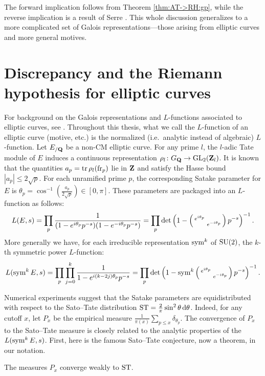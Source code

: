 The forward implication follows from Theorem \ref{thm:AT->RH:gp}, while the reverse implication is a result of Serre \cite[Th.~4]{serre-1981}. 
This whole discussion generalizes to a more complicated set of Galois 
representations---those arising from elliptic curves and more general motives.  





\section{Discrepancy and the Riemann hypothesis for elliptic curves}

For background on the Galois representations and $L$-functions associated to 
elliptic curves, see \cite[III\S7, C\S17]{silverman-2009}. Throughout this 
thesis, what we call the $L$-function of an elliptic curve (motive, etc.) is 
the normalized (i.e.~analytic instead of algebraic) $L$-function. 
Let $E_{/\mathbf{Q}}$ be a non-CM elliptic curve. For any prime $l$, the $l$-adic Tate 
module of $E$ induces a continuous representation 
$\rho_l \colon G_{\mathbf{Q}} \to \operatorname{GL}_2(\mathbf{Z}_l)$. It is known that the quantities 
$a_p = \operatorname{tr} \rho_l(\mathrm{fr}_p)$ lie in $\mathbf{Z}$ and satisfy the Hasse bound 
$|a_p| \leqslant 2\sqrt p$. For each unramified prime $p$, the 
corresponding Satake parameter for $E$ is 
$\theta_p = \cos^{-1}\left(\frac{a_p}{2\sqrt p}\right) \in [0,\pi]$. 
These parameters are packaged into an $L$-function as follows:
\[
	L(E,s) = \prod_p \frac{1}{(1 - e^{i \theta_p} p^{-s})(1- e^{-i \theta_p} p^{-s})} = \prod_p \det\left(1 - \left(\begin{smallmatrix} e^{i\theta_p} &  \\  & e^{-i \theta_p} \end{smallmatrix}\right)p^{-s}\right)^{-1}.
\]
More generally we have, for each irreducible representation $\operatorname{sym}^k$ of 
$\operatorname{SU}(2)$, the $k$-th symmetric power $L$-function: 
\[
	L(\operatorname{sym}^k E, s) = \prod_p \prod_{j=0}^k \frac{1}{1 - e^{i (k - 2j) \theta_p} p^{-s}} = \prod_p \det\left(1-\operatorname{sym}^k \left(\begin{smallmatrix} e^{i\theta_p} &  \\  & e^{-i \theta_p} \end{smallmatrix}\right)p^{-s}\right)^{-1}.
\]

Numerical experiments suggest that the Satake parameters are equidistributed 
with respect to the Sato--Tate distribution 
$\mathrm{ST} = \frac{2}{\pi} \sin^2\theta\, \mathrm{d}\theta$. Indeed, for any cutoff $x$, let 
$P_x$ be the empirical measure 
$\frac{1}{\pi(x)} \sum_{p\leqslant x} \delta_{\theta_p}$. 
The convergence of $P_x$ to the Sato--Tate measure is closely related to 
the analytic properties of the $L(\operatorname{sym}^k E,s)$. First, here is the famous 
Sato--Tate conjecture, now a theorem, in our notation. 

\begin{theorem}
The measures $P_x$ converge weakly to $\mathrm{ST}$. 
\end{theorem}

